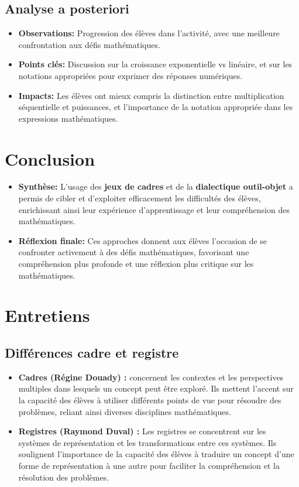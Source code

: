 \subsection{Analyse a posteriori}
\begin{itemize}
    \item \textbf{Observations:} Progression des élèves dans l'activité, avec une meilleure confrontation aux défis mathématiques.
    \item \textbf{Points clés:} Discussion sur la croissance exponentielle vs linéaire, et sur les notations appropriées pour exprimer des réponses numériques.
    \item \textbf{Impacts:} Les élèves ont mieux compris la distinction entre multiplication séquentielle et puissances, et l'importance de la notation appropriée dans les expressions mathématiques.
\end{itemize}

\section*{Conclusion}
\begin{itemize}
    \item \textbf{Synthèse:} L'usage des \textbf{jeux de cadres} et de la \textbf{dialectique outil-objet} a permis de cibler et d'exploiter efficacement les difficultés des élèves, enrichissant ainsi leur expérience d'apprentissage et leur compréhension des mathématiques.
    \item \textbf{Réflexion finale:} Ces approches donnent aux élèves l'occasion de se confronter activement à des défis mathématiques, favorisant une compréhension plus profonde et une réflexion plus critique sur les mathématiques.
\end{itemize}

\section*{Entretiens}
\subsection*{Différences cadre et registre}
\begin{itemize}
    \item \textbf{Cadres (Régine Douady) :} concernent les contextes et les perspectives multiples dans lesquels un concept peut être exploré. Ils mettent l'accent sur la capacité des élèves à utiliser différents points de vue pour résoudre des problèmes, reliant ainsi diverses disciplines mathématiques.
    \item \textbf{Registres (Raymond Duval) :} Les registres se concentrent sur les systèmes de représentation et les transformations entre ces systèmes. Ils soulignent l'importance de la capacité des élèves à traduire un concept d'une forme de représentation à une autre pour faciliter la compréhension et la résolution des problèmes.
\end{itemize}

